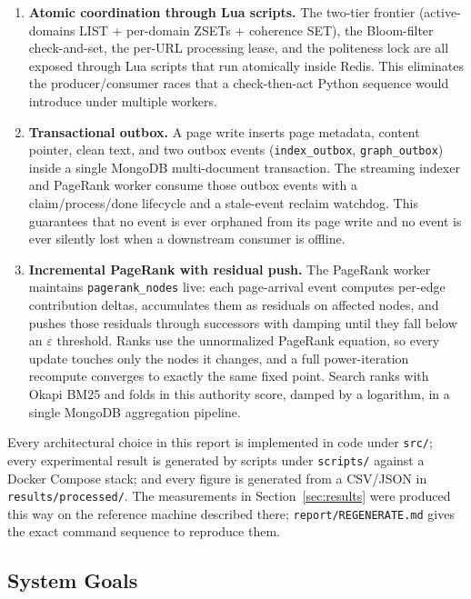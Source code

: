 \documentclass[11pt,a4paper]{article}
\newcommand{\code}[1]{\texttt{#1}}
\begin{document}
\begin{enumerate}
  \item \textbf{Atomic coordination through Lua scripts.} The two-tier frontier (active-domains LIST + per-domain ZSETs + coherence SET), the Bloom-filter check-and-set, the per-URL processing lease, and the politeness lock are all exposed through Lua scripts that run atomically inside Redis. This eliminates the producer/consumer races that a check-then-act Python sequence would introduce under multiple workers.
  \item \textbf{Transactional outbox.} A page write inserts page metadata, content pointer, clean text, and two outbox events (\code{index\_outbox}, \code{graph\_outbox}) inside a single MongoDB multi-document transaction. The streaming indexer and PageRank worker consume those outbox events with a claim/process/done lifecycle and a stale-event reclaim watchdog. This guarantees that no event is ever orphaned from its page write and no event is ever silently lost when a downstream consumer is offline.
  \item \textbf{Incremental PageRank with residual push.} The PageRank worker maintains \code{pagerank\_nodes} live: each page-arrival event computes per-edge contribution deltas, accumulates them as residuals on affected nodes, and pushes those residuals through successors with damping until they fall below an $\varepsilon$ threshold. Ranks use the unnormalized PageRank equation, so every update touches only the nodes it changes, and a full power-iteration recompute converges to exactly the same fixed point. Search ranks with Okapi BM25 and folds in this authority score, damped by a logarithm, in a single MongoDB aggregation pipeline.
\end{enumerate}

Every architectural choice in this report is implemented in code under \code{src/}; every experimental result is generated by scripts under \code{scripts/} against a Docker Compose stack; and every figure is generated from a CSV/JSON in \code{results/processed/}. The measurements in Section~\ref{sec:results} were produced this way on the reference machine described there; \code{report/REGENERATE.md} gives the exact command sequence to reproduce them.

\subsection{System Goals}
\end{document}
